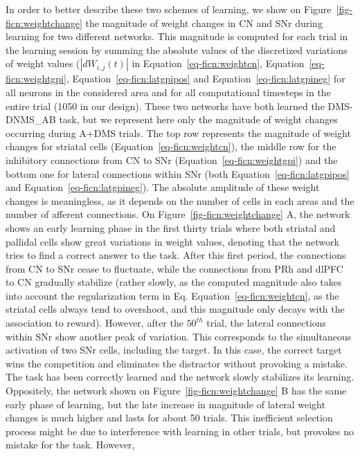 \documentclass[
  11pt,
  a4paper,
]{scrbook}
\begin{document}
In order to better describe these two schemes of learning, we show on
Figure~\ref{fig-ficn:weightchange} the magnitude of weight changes in CN
and SNr during learning for two different networks. This magnitude is
computed for each trial in the learning session by summing the absolute
values of the discretized variations of weight values
(\(|d W_{i,j}(t)|\) in
Equation~\ref{eq-ficn:weightcn}, Equation~\ref{eq-ficn:weightgpi}, Equation~\ref{eq-ficn:latgpipos}
and Equation~\ref{eq-ficn:latgpineg} for all neurons in the considered
area and for all computational timesteps in the entire trial (1050 in
our design). These two networks have both learned the DMS-DNMS\_AB task,
but we represent here only the magnitude of weight changes occurring
during A+DMS trials. The top row represents the magnitude of weight
changes for striatal cells (Equation~\ref{eq-ficn:weightcn}), the middle
row for the inhibitory connections from CN to SNr
(Equation~\ref{eq-ficn:weightgpi}) and the bottom one for lateral
connections within SNr (both Equation~\ref{eq-ficn:latgpipos} and
Equation~\ref{eq-ficn:latgpineg}). The absolute amplitude of these
weight changes is meaningless, as it depends on the number of cells in
each areas and the number of afferent connections. On
Figure~\ref{fig-ficn:weightchange} A, the network shows an early
learning phase in the first thirty trials where both striatal and
pallidal cells show great variations in weight values, denoting that the
network tries to find a correct answer to the task. After this first
period, the connections from CN to SNr cease to fluctuate, while the
connections from PRh and dlPFC to CN gradually stabilize (rather slowly,
as the computed magnitude also takes into account the regularization
term in Eq. Equation~\ref{eq-ficn:weightcn}, as the striatal cells
always tend to overshoot, and this magnitude only decays with the
association to reward). However, after the \(50^{th}\) trial, the
lateral connections within SNr show another peak of variation. This
corresponds to the simultaneous activation of two SNr cells, including
the target. In this case, the correct target wins the competition and
eliminates the distractor without provoking a mistake. The task has been
correctly learned and the network slowly stabilizes its learning.
Oppositely, the network shown on Figure~\ref{fig-ficn:weightchange} B
has the same early phase of learning, but the late increase in magnitude
of lateral weight changes is much higher and lasts for about 50 trials.
This inefficient selection process might be due to interference with
learning in other trials, but provokes no mistake for the task. However,
\end{document}
